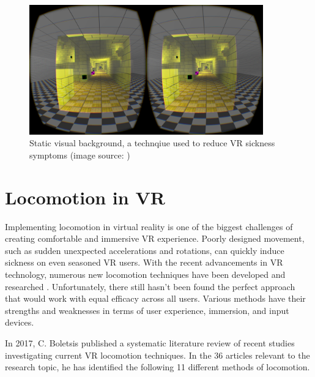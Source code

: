 \begin{figure}[th]
\centering
\includegraphics[width=0.9\textwidth]{img/static_background.png}
\caption{Static visual background, a technqiue used to reduce VR sickness symptoms (image source: \cite{STATICBACKGROUND})}
\label{fig:STATIC_BACKGROUND}
\end{figure}

\section{Locomotion in VR}
Implementing locomotion in virtual reality is one of the biggest challenges of creating comfortable and immersive VR experience. Poorly designed movement, such as sudden unexpected accelerations and rotations, can quickly induce sickness on even seasoned VR users. With the recent advancements in VR technology, numerous new locomotion techniques have been developed and researched \cite{VRHCI}. Unfortunately, there still hasn't been found the perfect approach that would work with equal efficacy across all users. Various methods have their strengths and weaknesses in terms of user experience, immersion, and input devices. 

In 2017, C. Boletsis published a systematic literature review \cite{LOCOMOTIONREVIEW} of recent studies investigating current VR locomotion techniques. In the 36 articles relevant to the research topic, he has identified the following 11 different methods of locomotion. 

